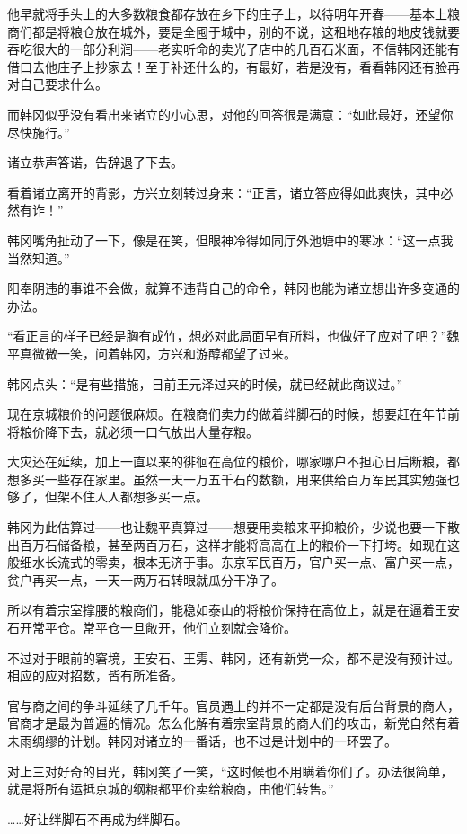 他早就将手头上的大多数粮食都存放在乡下的庄子上，以待明年开春——基本上粮商们都是将粮仓放在城外，要是全囤于城中，别的不说，这租地存粮的地皮钱就要吞吃很大的一部分利润——老实听命的卖光了店中的几百石米面，不信韩冈还能有借口去他庄子上抄家去！至于补还什么的，有最好，若是没有，看看韩冈还有脸再对自己要求什么。

而韩冈似乎没有看出来诸立的小心思，对他的回答很是满意：“如此最好，还望你尽快施行。”

诸立恭声答诺，告辞退了下去。

看着诸立离开的背影，方兴立刻转过身来：“正言，诸立答应得如此爽快，其中必然有诈！”

韩冈嘴角扯动了一下，像是在笑，但眼神冷得如同厅外池塘中的寒冰：“这一点我当然知道。”

阳奉阴违的事谁不会做，就算不违背自己的命令，韩冈也能为诸立想出许多变通的办法。

“看正言的样子已经是胸有成竹，想必对此局面早有所料，也做好了应对了吧？”魏平真微微一笑，问着韩冈，方兴和游醇都望了过来。

韩冈点头：“是有些措施，日前王元泽过来的时候，就已经就此商议过。”

现在京城粮价的问题很麻烦。在粮商们卖力的做着绊脚石的时候，想要赶在年节前将粮价降下去，就必须一口气放出大量存粮。

大灾还在延续，加上一直以来的徘徊在高位的粮价，哪家哪户不担心日后断粮，都想多买一些存在家里。虽然一天一万五千石的数额，用来供给百万军民其实勉强也够了，但架不住人人都想多买一点。

韩冈为此估算过——也让魏平真算过——想要用卖粮来平抑粮价，少说也要一下散出百万石储备粮，甚至两百万石，这样才能将高高在上的粮价一下打垮。如现在这般细水长流式的零卖，根本无济于事。东京军民百万，官户买一点、富户买一点，贫户再买一点，一天一两万石转眼就瓜分干净了。

所以有着宗室撑腰的粮商们，能稳如泰山的将粮价保持在高位上，就是在逼着王安石开常平仓。常平仓一旦敞开，他们立刻就会降价。

不过对于眼前的窘境，王安石、王雱、韩冈，还有新党一众，都不是没有预计过。相应的应对招数，皆有所准备。

官与商之间的争斗延续了几千年。官员遇上的并不一定都是没有后台背景的商人，官商才是最为普遍的情况。怎么化解有着宗室背景的商人们的攻击，新党自然有着未雨绸缪的计划。韩冈对诸立的一番话，也不过是计划中的一环罢了。

对上三对好奇的目光，韩冈笑了一笑，“这时候也不用瞒着你们了。办法很简单，就是将所有运抵京城的纲粮都平价卖给粮商，由他们转售。”

……好让绊脚石不再成为绊脚石。


